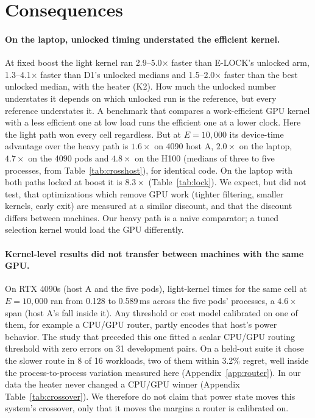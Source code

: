 \section{Consequences}\label{sec:consequences}
\paragraph{On the laptop, unlocked timing understated the efficient kernel.} At fixed boost the light kernel ran 2.9--5.0$\times$ faster than E-LOCK's unlocked arm, 1.3--4.1$\times$ faster than D1's unlocked medians and 1.5--2.0$\times$ faster than the best unlocked median, with the heater (K2). How much the unlocked number understates it depends on which unlocked run is the reference, but every reference understates it. A benchmark that compares a work-efficient GPU kernel with a less efficient one at low load runs the efficient one at a lower clock. Here the light path won every cell regardless. But at $E=10{,}000$ its device-time advantage over the heavy path is $1.6\times$ on 4090 host A, $2.0\times$ on the laptop, $4.7\times$ on the 4090 pods and $4.8\times$ on the H100 (medians of three to five processes, from Table~\ref{tab:crosshost}), for identical code. On the laptop with both paths locked at boost it is $8.3\times$ (Table~\ref{tab:lock}). We expect, but did not test, that optimizations which remove GPU work (tighter filtering, smaller kernels, early exit) are measured at a similar discount, and that the discount differs between machines. Our heavy path is a naive comparator; a tuned selection kernel would load the GPU differently.

\paragraph{Kernel-level results did not transfer between machines with the same GPU.} On RTX 4090s (host A and the five pods), light-kernel times for the same cell at $E=10{,}000$ ran from 0.128 to 0.589\,ms across the five pods' processes, a $4.6\times$ span (host A's fall inside it). Any threshold or cost model calibrated on one of them, for example a CPU/GPU router, partly encodes that host's power behavior. The study that preceded this one fitted a scalar CPU/GPU routing threshold with zero errors on 31 development pairs. On a held-out suite it chose the slower route in 8 of 16 workloads, two of them within 3.2\% regret, well inside the process-to-process variation measured here (Appendix~\ref{app:router}). In our data the heater never changed a CPU/GPU winner (Appendix Table~\ref{tab:crossover}). We therefore do not claim that power state moves this system's crossover, only that it moves the margins a router is calibrated on.

